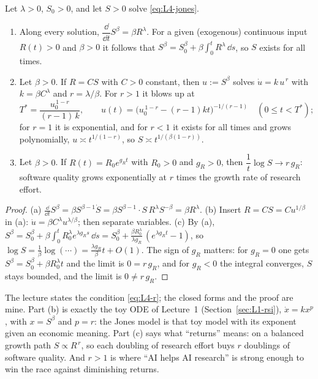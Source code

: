 \begin{prop}\label{prop:L4-loop}
Let $\lambda>0$, $S_0>0$, and let $S>0$ solve \eqref{eq:L4-jones}.
\begin{enumerate}[label=\textbf{(\alph*)}]
  \item Along every solution, $\dfrac{\dd}{\dd t}S^{\beta}=\beta R^{\lambda}$. For a given (exogenous) continuous input $R(t)>0$ and $\beta>0$ it follows that $S^{\beta}=S_0^{\beta}+\beta\int_0^tR^{\lambda}\,\dd s$, so $S$ exists for all times.
  \item Let $\beta>0$. If $R=CS$ with $C>0$ constant, then $u:=S^{\beta}$ solves $\dot u=k\,u^{\,r}$ with $k=\beta C^{\lambda}$ and $r=\lambda/\beta$. For $r>1$ it blows up at
  \[ T^*=\frac{u_0^{\,1-r}}{(r-1)\,k},\qquad u(t)=\big(u_0^{\,1-r}-(r-1)kt\big)^{-1/(r-1)}\quad(0\le t<T^*); \]
  for $r=1$ it is exponential, and for $r<1$ it exists for all times and grows polynomially, $u\asymp t^{1/(1-r)}$, so $S\asymp t^{1/(\beta(1-r))}$.
  \item Let $\beta>0$. If $R(t)=R_0e^{g_Rt}$ with $R_0>0$ and $g_R>0$, then $\dfrac1t\log S\to r\,g_R$: software quality grows exponentially at $r$ times the growth rate of research effort.
\end{enumerate}
\end{prop}
\begin{proof}
(a) $\frac{\dd}{\dd t}S^\beta=\beta S^{\beta-1}\dot S=\beta S^{\beta-1}\cdot S\,R^{\lambda}S^{-\beta}=\beta R^\lambda$. (b) Insert $R=CS=Cu^{1/\beta}$ in (a): $\dot u=\beta C^\lambda u^{\lambda/\beta}$; then separate variables. (c) By (a), $S^\beta=S_0^\beta+\beta\int_0^tR_0^\lambda e^{\lambda g_Rs}\,\dd s=S_0^\beta+\frac{\beta R_0^\lambda}{\lambda g_R}\,(e^{\lambda g_Rt}-1)$, so $\log S=\tfrac1\beta\log(\cdots)=\frac{\lambda g_R}{\beta}t+O(1)$. The sign of $g_R$ matters: for $g_R=0$ one gets $S^\beta=S_0^\beta+\beta R_0^\lambda t$ and the limit is $0=r\,g_R$, and for $g_R<0$ the integral converges, $S$ stays bounded, and the limit is $0\neq r\,g_R$.
\end{proof}
\noindent The lecture states the condition \eqref{eq:L4-r}; the closed forms and the proof are mine. Part (b) is exactly the toy ODE of Lecture~1 (Section~\ref{sec:L1-rsi}), $\dot x=kx^{p}$, with $x=S^{\beta}$ and $p=r$: the Jones model is that toy model with its exponent given an economic meaning. Part (c) says what ``returns'' means: on a balanced growth path $S\propto R^{\,r}$, so each doubling of research effort buys $r$ doublings of software quality. And $r>1$ is where ``AI helps AI research'' is strong enough to win the race against diminishing returns.

